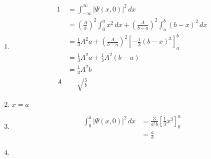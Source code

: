 \documentclass{article}
\begin{document}
\begin{enumerate}
  \item

        \begin{align*}
          1 & = \int_{-\infty}^\infty |\Psi(x, 0)|^2 \,d x                                                                  \\
            & = \left( \frac{A}{a} \right)^2 \int_0^a x^2 \,d x + \left( \frac{A}{b - a} \right)^2 \int_a^b (b - x)^2 \,d x \\
            & = \frac{1}{3} A^2 a + \left( \frac{A}{b - a} \right)^2 \left[ -\frac{1}{3} (b - x)^3 \right]_a^b              \\
            & = \frac{1}{3} A^2 a + \frac{1}{3} A^2 (b - a)                                                                 \\
            & = \frac{1}{3} A^2 b                                                                                           \\
          A & = \sqrt{\frac{3}{b}}
        \end{align*}

        \setcounter{enumi}{2}
  \item $x = a$

  \item

        \begin{align*}
          \int_0^a |\Psi(x, 0)|^2 \,d x & = \frac{3}{a^2 b} \left[ \frac{1}{3} x^3 \right]_0^a \\
                                        & = \frac{a}{b}
        \end{align*}

  \item


\end{enumerate}
\end{document}
